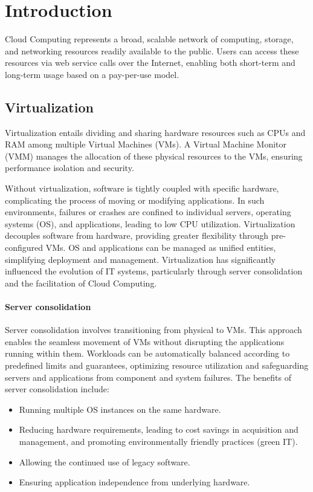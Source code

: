 \section{Introduction}

Cloud Computing represents a broad, scalable network of computing, storage, and networking resources readily available to the public. 
Users can access these resources via web service calls over the Internet, enabling both short-term and long-term usage based on a pay-per-use model.

\subsection{Virtualization}
Virtualization entails dividing and sharing hardware resources such as CPUs and RAM among multiple Virtual Machines (VMs). 
A Virtual Machine Monitor (VMM) manages the allocation of these physical resources to the VMs, ensuring performance isolation and security.

Without virtualization, software is tightly coupled with specific hardware, complicating the process of moving or modifying applications.
In such environments, failures or crashes are confined to individual servers, operating systems (OS), and applications, leading to low CPU utilization.
Virtualization decouples software from hardware, providing greater flexibility through pre-configured VMs. 
OS and applications can be managed as unified entities, simplifying deployment and management.
Virtualization has significantly influenced the evolution of IT systems, particularly through server consolidation and the facilitation of Cloud Computing.

\paragraph*{Server consolidation}
Server consolidation involves transitioning from physical to VMs.
This approach enables the seamless movement of VMs without disrupting the applications running within them. 
Workloads can be automatically balanced according to predefined limits and guarantees, optimizing resource utilization and safeguarding servers and applications from component and system failures. 
The benefits of server consolidation include:
\begin{itemize}
    \item Running multiple OS instances on the same hardware.
    \item Reducing hardware requirements, leading to cost savings in acquisition and management, and promoting environmentally friendly practices (green IT).
    \item Allowing the continued use of legacy software.
    \item Ensuring application independence from underlying hardware.
\end{itemize}